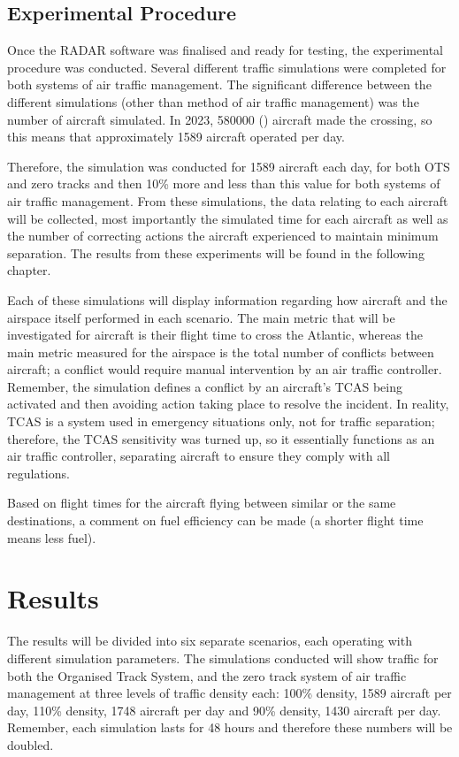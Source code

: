 \documentclass[stu, a4paper, 12pt, floatsintext]{apa7}
\numberwithin{figure}{section}
\numberwithin{table}{section}
\numberwithin{equation}{section}
\begin{document}
\subsection{Experimental Procedure}
Once the RADAR software was finalised and ready for testing, the experimental procedure was conducted. Several different traffic simulations were completed for both systems of air traffic management. The significant difference between the different simulations (other than method of air traffic management) was the number of aircraft simulated. In 2023, 580000 (\cite{ForeFlight}) aircraft made the crossing, so this means that approximately 1589 aircraft operated per day.

Therefore, the simulation was conducted for 1589 aircraft each day, for both OTS and zero tracks and then 10\% more and less than this value for both systems of air traffic management. From these simulations, the data relating to each aircraft will be collected, most importantly the simulated time for each aircraft as well as the number of correcting actions the aircraft experienced to maintain minimum separation. The results from these experiments will be found in the following chapter.

Each of these simulations will display information regarding how aircraft and the airspace itself performed in each scenario. The main metric that will be investigated for aircraft is their flight time to cross the Atlantic, whereas the main metric measured for the airspace is the total number of conflicts between aircraft; a conflict would require manual intervention by an air traffic controller. Remember, the simulation defines a conflict by an aircraft’s TCAS being activated and then avoiding action taking place to resolve the incident. In reality, TCAS is a system used in emergency situations only, not for traffic separation; therefore, the TCAS sensitivity was turned up, so it essentially functions as an air traffic controller, separating aircraft to ensure they comply with all regulations. 

Based on flight times for the aircraft flying between similar or the same destinations, a comment on fuel efficiency can be made (a shorter flight time means less fuel).

\newpage
\section{Results}
The results will be divided into six separate scenarios, each operating with different simulation parameters. The simulations conducted will show traffic for both the Organised Track System, and the zero track system of air traffic management at three levels of traffic density each: 100\% density, 1589 aircraft per day, 110\% density,  1748 aircraft per day and 90\% density, 1430 aircraft per day. Remember, each simulation lasts for 48 hours and therefore these numbers will be doubled. 
\end{document}
